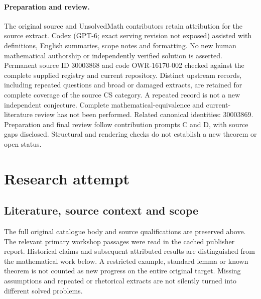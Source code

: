 \documentclass[11pt]{article}
\begin{document}
\paragraph{Preparation and review.}
The original source and UnsolvedMath contributors retain attribution for the source extract. Codex (GPT-6; exact serving revision not exposed) assisted with definitions, English summaries, scope notes and formatting. No new human mathematical authorship or independently verified solution is asserted. Permanent source ID 30003868 and code OWR-16170-002 checked against the complete supplied registry and current repository. Distinct upstream records, including repeated questions and broad or damaged extracts, are retained for complete coverage of the source CS category. A repeated record is not a new independent conjecture. Complete mathematical-equivalence and current-literature review has not been performed. Related canonical identities: 30003869. Preparation and final review follow contribution prompts C and D, with source gaps disclosed. Structural and rendering checks do not establish a new theorem or open status.
\label{end:30003868}

\section{Research attempt}
\subsection{Literature, source context and scope}
The full original catalogue body and source qualifications are preserved above. The relevant primary workshop passages were read in the cached publisher report. Historical claims and subsequent attributed results are distinguished from the mathematical work below. A restricted example, standard lemma or known theorem is not counted as new progress on the entire original target. Missing assumptions and repeated or rhetorical extracts are not silently turned into different solved problems.
\end{document}
